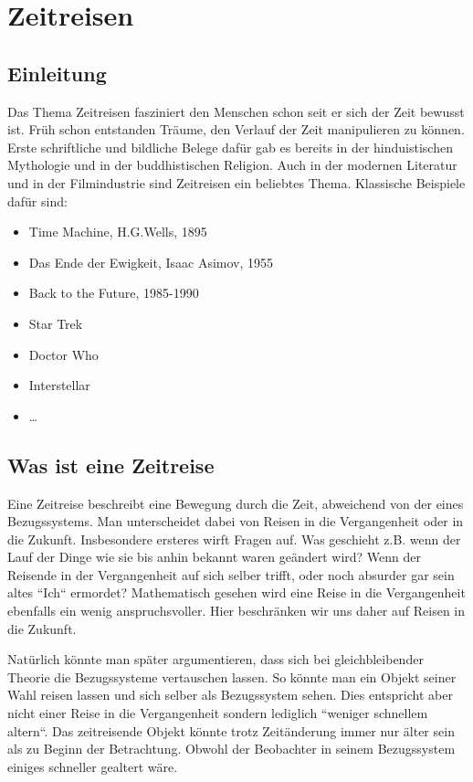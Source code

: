 \chapter{Zeitreisen\label{chapter:thema}}
\begin{refsection}
\section{Einleitung}
Das Thema Zeitreisen fasziniert den Menschen schon seit er sich der Zeit bewusst ist. Früh schon entstanden Träume, den Verlauf der Zeit manipulieren zu können. Erste schriftliche und bildliche Belege dafür gab es bereits in der hinduistischen Mythologie und in der buddhistischen Religion. Auch in der modernen Literatur und in der Filmindustrie sind Zeitreisen ein beliebtes Thema. Klassische Beispiele daf\"ur sind: 
\begin{itemize}
    \item Time Machine, H.G.Wells, 1895 
    \item Das Ende der Ewigkeit, Isaac Asimov, 1955
    \item Back to the Future, 1985-1990
    \item Star Trek
    \item Doctor Who
    \item Interstellar
    \item \ldots
\end{itemize}
\section{Was ist eine Zeitreise}
Eine Zeitreise beschreibt eine Bewegung durch die Zeit, abweichend von der eines Bezugssystems. Man unterscheidet dabei von Reisen in die Vergangenheit oder in die Zukunft. Insbesondere ersteres wirft Fragen auf. Was geschieht z.B. wenn der Lauf der Dinge wie sie bis anhin bekannt waren geändert wird? Wenn der Reisende in der Vergangenheit auf sich selber trifft, oder noch absurder gar sein altes ``Ich`` ermordet? 
Mathematisch gesehen wird eine Reise in die Vergangenheit ebenfalls ein wenig anspruchsvoller. Hier beschränken wir uns daher auf Reisen in die Zukunft. 

Natürlich könnte man später argumentieren, dass sich bei gleichbleibender Theorie die Bezugssysteme vertauschen lassen. So könnte man ein Objekt seiner Wahl reisen lassen und sich selber als Bezugssystem sehen. Dies entspricht aber nicht einer Reise in die Vergangenheit sondern lediglich ``weniger schnellem altern``. Das zeitreisende  Objekt könnte trotz Zeit\"anderung immer nur älter sein als zu Beginn der Betrachtung. Obwohl der Beobachter in seinem Bezugssystem einiges schneller gealtert wäre.


\end{refsection}

